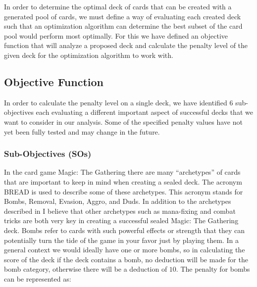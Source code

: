 \documentclass[12pt, letterpaper]{article}
\newcounter{subsubsubsection}[subsubsection]
\begin{document}
In order to determine the optimal deck of cards that can be created with a generated pool of cards,
we must define a way of evaluating each created deck such that an optimization algorithm can determine
the best subset of the card pool would perform most optimally.
For this we have defined an objective function that will analyze a proposed deck
and calculate the penalty level of the given deck for the optimization algorithm to work with.

\subsection{Objective Function}

In order to calculate the penalty level on a single deck,
we have identified 6 sub-objectives each evaluating a different
important aspect of successful decks that we want to consider in our analysis.
Some of the specified penalty values have not yet been fully tested and may change in the future.

\subsubsection{Sub-Objectives (SOs)}







In the card game Magic: The Gathering there are many “archetypes” of cards that are
important to keep in mind when creating a sealed deck.
The acronym BREAD is used to describe some of these archetypes.
This acronym stands for Bombs, Removal, Evasion, Aggro, and Duds.
In addition to the archetypes described in I believe that other archetypes such as
mana-fixing and combat tricks are both very key in creating a successful sealed Magic: The Gathering deck.
Bombs refer to cards with such powerful effects or strength that they can potentially turn
the tide of the game in your favor just by playing them.
In a general context we would ideally have one or more bombs,
so in calculating the score of the deck if the deck contains a bomb,
no deduction will be made for the bomb category, otherwise there will be a deduction of $ 10 $.
The penalty for bombs can be represented as:
\end{document}
